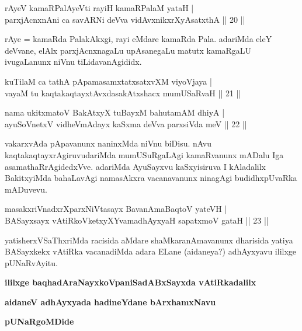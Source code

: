 \begin{shl}
rAyeV kamaRPalAyeVti rayiH kamaRPalaM yataH | \\
parxjAcnxnAni ca savARNi deVva vidAvxnikxrXyAsatxthA \hfill||  20 ||
\end{shl}

\begin{artha} 
rAye = kamaRda PalakAkxgi, rayi eMdare kamaRda Pala. adariMda eleY 
deVvane, elAlx parxjAcnxnagaLu upAsanegaLu matutx kamaRgaLU 
ivugaLanunx niVnu tiLidavanAgididx.
\end{artha}

\begin{shl}
kuTilaM ca tathA pApamasamxtatxsatxvXM viyoVjaya | \\
vayaM tu kaqtakaqtayxtAvxdasakAtxshacx mumUSaRvaH \hfill||  21 || 
\end{shl}

\begin{shl}
nama ukitxmatoV BakAtxyX tuBayxM bahutamAM dhiyA | \\
ayuSoV\s netxV vidheVmAdayx kaSxma deVva parxsiVda meV \hfill||  22 || 
\end{shl}

\begin{artha} 
vakarxvAda pApavanunx naninxMda niVnu biDisu. nAvu 
kaqtakaqtayxrAgiruvudariMda mumUSuRgaLAgi kamaRvanunx mADalu Iga\break 
asamathaRrAgidedxVve. adariMda AyuSayxvu kaSxyisiruva I kAladalilx 
BakitxyiMda bahaLavAgi namasAkxra vacanavanunx ninagAgi budidhxpUvaRka 
mADuvevu.
\end{artha}


\begin{shl}
masakxriVnadxrXparxNiVtasayx BavanAmaBaqtoV yateVH | \\
BASayxsayx vAtiRkoVketxyXYvamadhAyxyaH sapatxmoV gataH \hfill||  23 || 
\end{shl}

\begin{artha} 
yatisherxVSaThxriMda racisida aMdare shaMkaranAmavanunx 
dharisida yatiya BASayxkekx vAtiRka vacanadiMda adara ELane (aidaneya?) adhAyxyavu 
ililxge pUNaRvAyitu.
\end{artha}



\begin{center}
{\bf ililxge baqhadAraNayxkoVpaniSadABxSayxda vAtiRkadalilx}

\smallskip
{\bf aidaneV adhAyxyada hadineYdane bArxhamxNavu}

\smallskip
{\bf pUNaRgoMDide}
\end{center}


\centerline{}
